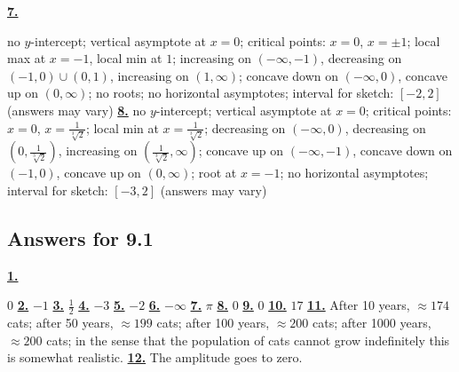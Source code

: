 \hypertarget {a:8.5.7}{\hyperlink {e:8.5.7}{\bfseries 7.}} \mdseries no $y$-intercept; vertical asymptote at $x=0$; critical points: $x=0$, $x=\pm 1$; local max at $x=-1$, local min at $1$; increasing on $(-\infty ,-1)$, decreasing on $(-1,0)\cup (0,1)$, increasing on $(1,\infty )$; concave down on $(-\infty ,0)$, concave up on $(0, \infty )$; no roots; no horizontal asymptotes; interval for sketch: $[-2,2]$ (answers may vary)\qquad 
\hypertarget {a:8.5.8}{\hyperlink {e:8.5.8}{\bfseries 8.}} \mdseries no $y$-intercept; vertical asymptote at $x=0$; critical points: $x=0$, $x=\frac {1}{\sqrt [3]{2}}$; local min at $x=\frac {1}{\sqrt [3]{2}}$; decreasing on $(-\infty ,0)$, decreasing on $(0,\frac {1}{\sqrt [3]{2}})$, increasing on $(\frac {1}{\sqrt [3]{2}},\infty )$; concave up on $(-\infty ,-1)$, concave down on $(-1,0)$, concave up on $(0,\infty )$; root at $x=-1$; no horizontal asymptotes; interval for sketch: $[-3,2]$ (answers may vary)\qquad 
\subsection *{Answers for 9.1}
\hypertarget {a:9.1.1}{\hyperlink {e:9.1.1}{\bfseries 1.}} \mdseries $0$\qquad 
\hypertarget {a:9.1.2}{\hyperlink {e:9.1.2}{\bfseries 2.}} \mdseries $-1$\qquad 
\hypertarget {a:9.1.3}{\hyperlink {e:9.1.3}{\bfseries 3.}} \mdseries $\frac {1}{2}$\qquad 
\hypertarget {a:9.1.4}{\hyperlink {e:9.1.4}{\bfseries 4.}} \mdseries $-3$\qquad 
\hypertarget {a:9.1.5}{\hyperlink {e:9.1.5}{\bfseries 5.}} \mdseries $-2$\qquad 
\hypertarget {a:9.1.6}{\hyperlink {e:9.1.6}{\bfseries 6.}} \mdseries $-\infty $\qquad 
\hypertarget {a:9.1.7}{\hyperlink {e:9.1.7}{\bfseries 7.}} \mdseries $\pi $\qquad 
\hypertarget {a:9.1.8}{\hyperlink {e:9.1.8}{\bfseries 8.}} \mdseries $0$\qquad 
\hypertarget {a:9.1.9}{\hyperlink {e:9.1.9}{\bfseries 9.}} \mdseries $0$\qquad 
\hypertarget {a:9.1.10}{\hyperlink {e:9.1.10}{\bfseries 10.}} \mdseries $17$\qquad 
\hypertarget {a:9.1.11}{\hyperlink {e:9.1.11}{\bfseries 11.}} \mdseries After 10 years, $\approx 174$ cats; after 50 years, $\approx 199$ cats; after 100 years, $\approx 200$ cats; after 1000 years, $\approx 200$ cats; in the sense that the population of cats cannot grow indefinitely this is somewhat realistic.\qquad 
\hypertarget {a:9.1.12}{\hyperlink {e:9.1.12}{\bfseries 12.}} \mdseries The amplitude goes to zero.\qquad 
